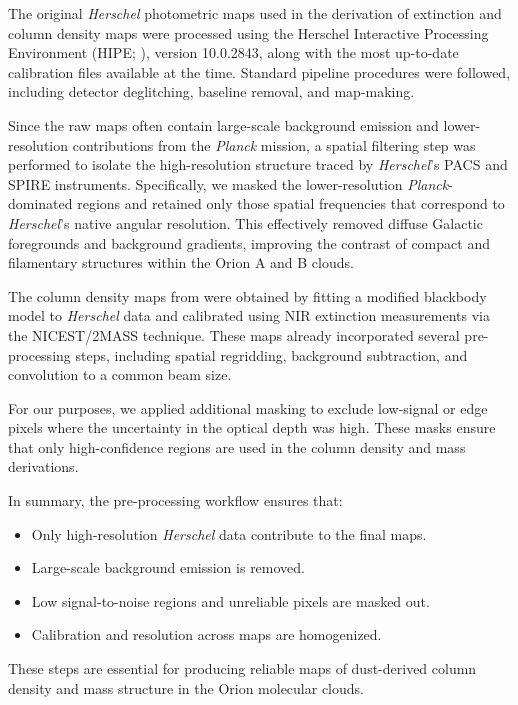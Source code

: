 The original \textit{Herschel} photometric maps used in the derivation of extinction and column density maps were processed using the Herschel Interactive Processing Environment (HIPE; \cite{mizumoto2010astronomical}), version 10.0.2843, along with the most up-to-date calibration files available at the time. Standard pipeline procedures were followed, including detector deglitching, baseline removal, and map-making.

Since the raw maps often contain large-scale background emission and lower-resolution contributions from the \textit{Planck} mission, a spatial filtering step was performed to isolate the high-resolution structure traced by \textit{Herschel}'s PACS and SPIRE instruments. Specifically, we masked the lower-resolution \textit{Planck}-dominated regions and retained only those spatial frequencies that correspond to \textit{Herschel}'s native angular resolution. This effectively removed diffuse Galactic foregrounds and background gradients, improving the contrast of compact and filamentary structures within the Orion A and B clouds.

The column density maps from \cite{lombardi2014herschel} were obtained by fitting a modified blackbody model to \textit{Herschel} data and calibrated using NIR extinction measurements via the NICEST/2MASS technique. These maps already incorporated several pre-processing steps, including spatial regridding, background subtraction, and convolution to a common beam size.

For our purposes, we applied additional masking to exclude low-signal or edge pixels where the uncertainty in the optical depth was high. These masks ensure that only high-confidence regions are used in the column density and mass derivations.

In summary, the pre-processing workflow ensures that:
\begin{itemize}
    \item Only high-resolution \textit{Herschel} data contribute to the final maps.
    \item Large-scale background emission is removed.
    \item Low signal-to-noise regions and unreliable pixels are masked out.
    \item Calibration and resolution across maps are homogenized.
\end{itemize}

These steps are essential for producing reliable maps of dust-derived column density and mass structure in the Orion molecular clouds.

